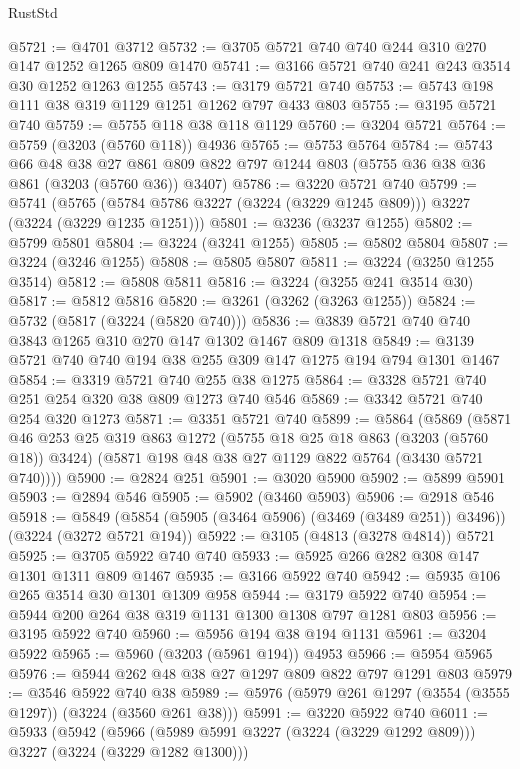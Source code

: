 \begin{lexlean}{RustStd}
\begin{coremodule}
@5721 := @4701 @3712
@5732 := @3705 @5721 @740 @740 @244 @310 @270 @147 @1252 @1265 @809 @1470
@5741 := @3166 @5721 @740 @241 @243 @3514 @30 @1252 @1263 @1255
@5743 := @3179 @5721 @740
@5753 := @5743 @198 @111 @38 @319 @1129 @1251 @1262 @797 @433 @803
@5755 := @3195 @5721 @740
@5759 := @5755 @118 @38 @118 @1129
@5760 := @3204 @5721
@5764 := @5759 (@3203 (@5760 @118)) @4936
@5765 := @5753 @5764
@5784 := @5743
    @66
    @48
    @38
    @27
    @861
    @809
    @822
    @797
    @1244
    @803
    (@5755 @36 @38 @36 @861 (@3203 (@5760 @36)) @3407)
@5786 := @3220 @5721 @740
@5799 := @5741
    (@5765 (@5784 @5786 @3227 (@3224 (@3229 @1245 @809))) @3227 (@3224 (@3229 @1235 @1251)))
@5801 := @3236 (@3237 @1255)
@5802 := @5799 @5801
@5804 := @3224 (@3241 @1255)
@5805 := @5802 @5804
@5807 := @3224 (@3246 @1255)
@5808 := @5805 @5807
@5811 := @3224 (@3250 @1255 @3514)
@5812 := @5808 @5811
@5816 := @3224 (@3255 @241 @3514 @30)
@5817 := @5812 @5816
@5820 := @3261 (@3262 (@3263 @1255))
@5824 := @5732 (@5817 (@3224 (@5820 @740)))
@5836 := @3839 @5721 @740 @740 @3843 @1265 @310 @270 @147 @1302 @1467 @809 @1318
@5849 := @3139 @5721 @740 @740 @194 @38 @255 @309 @147 @1275 @194 @794 @1301 @1467
@5854 := @3319 @5721 @740 @255 @38 @1275
@5864 := @3328 @5721 @740 @251 @254 @320 @38 @809 @1273 @740 @546
@5869 := @3342 @5721 @740 @254 @320 @1273
@5871 := @3351 @5721 @740
@5899 := @5864
    (@5869
      (@5871
        @46
        @253
        @25
        @319
        @863
        @1272
        (@5755 @18 @25 @18 @863 (@3203 (@5760 @18)) @3424)
        (@5871 @198 @48 @38 @27 @1129 @822 @5764 (@3430 @5721 @740))))
@5900 := @2824 @251
@5901 := @3020 @5900
@5902 := @5899 @5901
@5903 := @2894 @546
@5905 := @5902 (@3460 @5903)
@5906 := @2918 @546
@5918 := @5849 (@5854 (@5905 (@3464 @5906) (@3469 (@3489 @251)) @3496)) (@3224 (@3272 @5721 @194))
@5922 := @3105 (@4813 (@3278 @4814)) @5721
@5925 := @3705 @5922 @740 @740
@5933 := @5925 @266 @282 @308 @147 @1301 @1311 @809 @1467
@5935 := @3166 @5922 @740
@5942 := @5935 @106 @265 @3514 @30 @1301 @1309 @958
@5944 := @3179 @5922 @740
@5954 := @5944 @200 @264 @38 @319 @1131 @1300 @1308 @797 @1281 @803
@5956 := @3195 @5922 @740
@5960 := @5956 @194 @38 @194 @1131
@5961 := @3204 @5922
@5965 := @5960 (@3203 (@5961 @194)) @4953
@5966 := @5954 @5965
@5976 := @5944 @262 @48 @38 @27 @1297 @809 @822 @797 @1291 @803
@5979 := @3546 @5922 @740 @38
@5989 := @5976 (@5979 @261 @1297 (@3554 (@3555 @1297)) (@3224 (@3560 @261 @38)))
@5991 := @3220 @5922 @740
@6011 := @5933
    (@5942
      (@5966 (@5989 @5991 @3227 (@3224 (@3229 @1292 @809))) @3227 (@3224 (@3229 @1282 @1300)))

\end{coremodule}
\end{lexlean}

